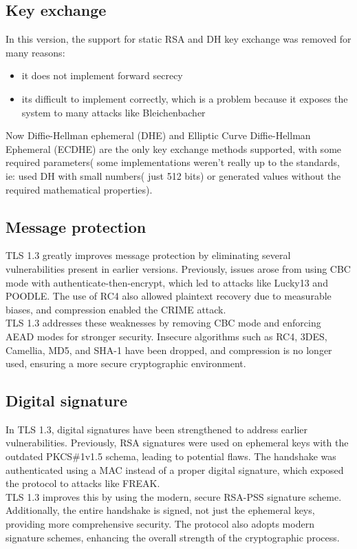\subsection{Key exchange}
In this version, the support for static RSA and DH key exchange was
removed for many reasons:
\begin{itemize}
  \item it does not implement forward secrecy 
  \item its difficult to implement correctly, which is a problem
    because it exposes the system to many attacks like Bleichenbacher
\end{itemize}
Now Diffie-Hellman ephemeral (DHE) and Elliptic Curve Diffie-Hellman
Ephemeral (ECDHE) are the only key exchange methods supported, with
some required parameters( some implementations weren't really up to
the standards, ie: used DH with small numbers( just 512 bits) or
generated values without the required mathematical properties).

\subsection{Message protection}
TLS 1.3 greatly improves message protection by eliminating several
vulnerabilities present in earlier versions. Previously, issues arose
from using CBC mode with authenticate-then-encrypt, which led to
attacks like Lucky13 and POODLE. The use of RC4 also allowed plaintext
recovery due to measurable biases, and compression enabled the CRIME
attack.\\
TLS 1.3 addresses these weaknesses by removing CBC mode and enforcing
AEAD modes for stronger security. Insecure algorithms such as RC4,
3DES, Camellia, MD5, and SHA-1 have been dropped, and compression is
no longer used, ensuring a more secure cryptographic environment.

\subsection{Digital signature}
In TLS 1.3, digital signatures have been strengthened to address
earlier vulnerabilities. Previously, RSA signatures were used on
ephemeral keys with the outdated PKCS\#1v1.5 schema, leading to
potential flaws. The handshake was authenticated using a MAC instead
of a proper digital signature, which exposed the protocol to attacks
like FREAK.\\
TLS 1.3 improves this by using the modern, secure RSA-PSS signature
scheme. Additionally, the entire handshake is signed, not just the
ephemeral keys, providing more comprehensive security. The protocol
also adopts modern signature schemes, enhancing the overall strength
of the cryptographic process.

